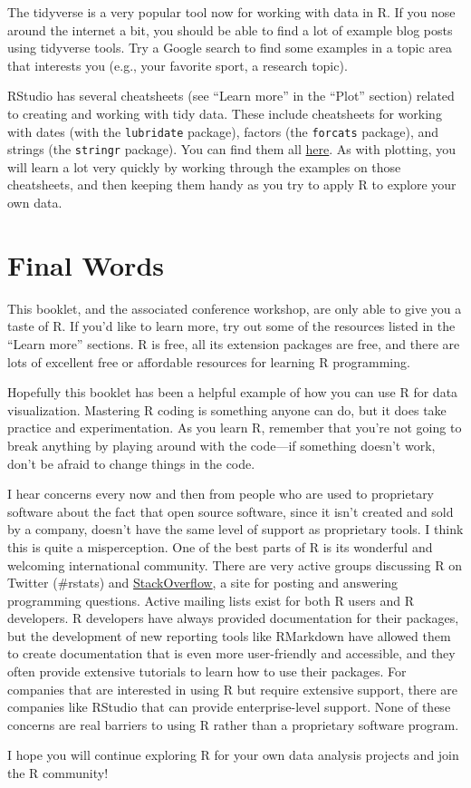 \documentclass[]{tufte-book}
\begin{document}
The tidyverse is a very popular tool now for working with data in R. If you nose around the
internet a bit, you should be able to find a lot of example blog posts using tidyverse tools.
Try a Google search to find some examples in a topic area that interests you (e.g., your
favorite sport, a research topic).

RStudio has several cheatsheets (see ``Learn more'' in the ``Plot'' section) related to creating
and working with tidy data. These include cheatsheets for working with dates (with the
\texttt{lubridate} package), factors (the \texttt{forcats} package), and strings (the \texttt{stringr} package). You
can find them all \href{https://www.rstudio.com/resources/cheatsheets/}{here}. As with plotting, you
will learn a lot very quickly by working through the examples on those cheatsheets, and then
keeping them handy as you try to apply R to explore your own data.

\hypertarget{final-words}{%
\chapter{Final Words}\label{final-words}}

This booklet, and the associated conference workshop, are only able to give you a taste of R.
If you'd like to learn more, try out some of the resources listed in the ``Learn more'' sections.
R is free, all its extension packages are free, and there are lots of excellent free or affordable
resources for learning R programming.

Hopefully this booklet has been a helpful example of how you can use R for data visualization.
Mastering R coding is something anyone can do, but it does take practice and experimentation.
As you learn R, remember that you're not going to break anything by playing around with the
code---if something doesn't work, don't be afraid to change things in the code.

I hear concerns every now and then from people who are used to proprietary software about
the fact that open source software, since it isn't created and sold by a company, doesn't have
the same level of support as proprietary tools. I think this is quite a misperception.
One of the best parts of R is its wonderful and welcoming international community. There
are very active groups discussing R on Twitter (\#rstats) and
\href{https://stackoverflow.com/}{StackOverflow}, a site for
posting and answering programming questions. Active mailing lists exist for both R users and
R developers. R developers have always provided documentation for their packages, but the
development of new reporting tools like RMarkdown have allowed them to create documentation that
is even more user-friendly and accessible, and they often provide extensive tutorials to learn
how to use their packages. For companies that are interested in using R but require
extensive support, there are companies like RStudio that can provide enterprise-level support.
None of these concerns are real barriers to using R rather than a proprietary software program.

I hope you will continue exploring R for your own data analysis projects and join the R community!


\end{document}
